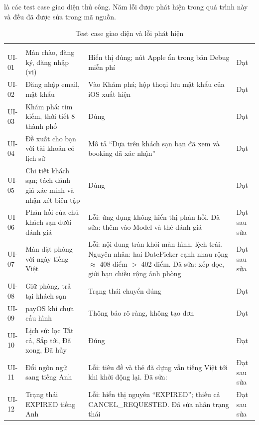  là các test case giao diện thủ công. Năm lỗi được phát hiện trong quá trình này và đều đã được sửa trong mã nguồn.

\begin{rtable}
\begin{longtable}{|C{1.2cm}|L{6.4cm}|L{5.2cm}|C{1.8cm}|}
\caption{Test case giao diện và lỗi phát hiện}\label{tab:test-ui}\\
\hline
{} &  &  &  \\ \hline
\endfirsthead
\hline
{} &  &  &  \\ \hline
\endhead
UI-01 & Màn chào, đăng ký, đăng nhập (vi) & Hiển thị đúng; nút Apple ẩn trong bản Debug miễn phí & Đạt \\ \hline
UI-02 & Đăng nhập email, mật khẩu & Vào Khám phá; hộp thoại lưu mật khẩu của iOS xuất hiện & Đạt \\ \hline
UI-03 & Khám phá: tìm kiếm, thời tiết 8 thành phố & Đúng & Đạt \\ \hline
UI-04 & Đề xuất cho bạn với tài khoản có lịch sử & Mô tả ``Dựa trên khách sạn bạn đã xem và booking đã xác nhận'' & Đạt \\ \hline
UI-05 & Chi tiết khách sạn; tách đánh giá xác minh và nhận xét biên tập & Đúng & Đạt \\ \hline
UI-06 & Phản hồi của chủ khách sạn dưới đánh giá & Lỗi: ứng dụng không hiển thị phản hồi. Đã sửa: thêm  vào Model và thẻ đánh giá & Đạt sau sửa \\ \hline
UI-07 & Màn đặt phòng với ngày tiếng Việt & Lỗi: nội dung tràn khỏi màn hình, lệch trái. Nguyên nhân: hai DatePicker cạnh nhau rộng $\approx$ 408 điểm $>$ 402 điểm. Đã sửa: xếp dọc, giới hạn chiều rộng ảnh phòng & Đạt sau sửa \\ \hline
UI-08 & Giữ phòng, trả tại khách sạn & Trạng thái chuyển đúng & Đạt \\ \hline
UI-09 & payOS khi chưa cấu hình & Thông báo rõ ràng, không tạo đơn & Đạt \\ \hline
UI-10 & Lịch sử: lọc Tất cả, Sắp tới, Đã xong, Đã hủy & Đúng & Đạt \\ \hline
UI-11 & Đổi ngôn ngữ sang tiếng Anh & Lỗi: tiêu đề và thẻ đã dựng vẫn tiếng Việt tới khi khởi động lại. Đã sửa:  & Đạt sau sửa \\ \hline
UI-12 & Trạng thái EXPIRED tiếng Anh & Lỗi: hiển thị nguyên ``EXPIRED''; thiếu cả CANCEL\_REQUESTED. Đã sửa nhãn trạng thái & Đạt sau sửa \\ \hline

\end{longtable}
\end{rtable}
